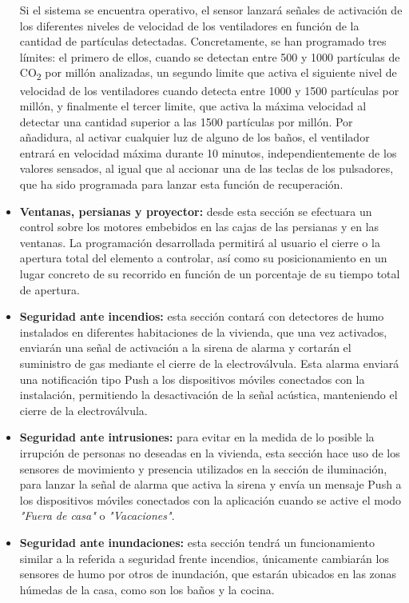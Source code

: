 \begin{itemize}
Si el sistema se encuentra operativo, el sensor lanzará señales de activación de los diferentes niveles de velocidad de los ventiladores en función de la cantidad de partículas detectadas. Concretamente, se han programado tres límites: el primero de ellos, cuando se detectan entre 500 y 1000 partículas de CO\textsubscript{2} por millón analizadas, un segundo limite que activa el siguiente nivel de velocidad de los ventiladores cuando detecta entre 1000 y 1500 partículas por millón, y finalmente el tercer limite, que activa la máxima velocidad al detectar una cantidad superior a las 1500 partículas por millón. Por añadidura, al activar cualquier luz de alguno de los baños, el ventilador entrará en velocidad máxima durante 10 minutos, independientemente de los valores sensados, al igual que al accionar una de las teclas de los pulsadores, que ha sido programada para lanzar esta función de recuperación.\\
\item \textbf{Ventanas, persianas y proyector: }desde esta sección se efectuara un control sobre los motores embebidos en las cajas de las persianas y en las ventanas. La programación desarrollada permitirá al usuario el cierre o la apertura total del elemento a controlar, así como su posicionamiento en un lugar concreto de su recorrido en función de un porcentaje de su tiempo total de apertura.\\
\item \textbf{Seguridad ante incendios: }esta sección contará con detectores de humo instalados en diferentes habitaciones de la vivienda, que una vez activados, enviarán una señal de activación a la sirena de alarma y cortarán el suministro de gas mediante el cierre de la electroválvula. Esta alarma enviará una notificación tipo Push a los dispositivos móviles conectados con la instalación, permitiendo la desactivación de la señal acústica, manteniendo el cierre de la electroválvula.\\
\item \textbf{Seguridad ante intrusiones: }para evitar en la medida de lo posible la irrupción de personas no deseadas en la vivienda, esta sección hace uso de los sensores de movimiento y presencia utilizados en la sección de iluminación, para lanzar la señal de alarma que activa la sirena y envía un mensaje Push a los dispositivos móviles conectados con la aplicación cuando se active el modo \textit{"Fuera de casa"} o \textit{"Vacaciones"}.\\
\item \textbf{Seguridad ante inundaciones: }esta sección tendrá un funcionamiento similar a la referida a seguridad frente incendios, únicamente cambiarán los sensores de humo por otros de inundación, que estarán ubicados en las zonas húmedas de la casa, como son los baños y la cocina.\\

\end{itemize}
